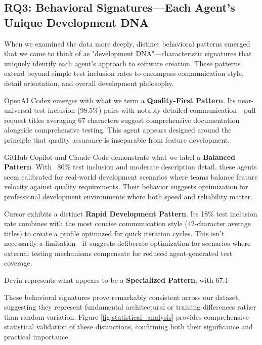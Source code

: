 \documentclass[conference]{IEEEtran}
\begin{document}
\subsection{RQ3: Behavioral Signatures—Each Agent's Unique Development DNA}

When we examined the data more deeply, distinct behavioral patterns emerged that we came to think of as "development DNA"—characteristic signatures that uniquely identify each agent's approach to software creation. These patterns extend beyond simple test inclusion rates to encompass communication style, detail orientation, and overall development philosophy.

OpenAI Codex emerges with what we term a \textbf{Quality-First Pattern}. Its near-universal test inclusion (98.5\%) pairs with notably detailed communication—pull request titles averaging 67 characters suggest comprehensive documentation alongside comprehensive testing. This agent appears designed around the principle that quality assurance is inseparable from feature development.

GitHub Copilot and Claude Code demonstrate what we label a \textbf{Balanced Pattern}. With ~80\% test inclusion and moderate description detail, these agents seem calibrated for real-world development scenarios where teams balance feature velocity against quality requirements. Their behavior suggests optimization for professional development environments where both speed and reliability matter.

Cursor exhibits a distinct \textbf{Rapid Development Pattern}. Its 18\% test inclusion rate combines with the most concise communication style (42-character average titles) to create a profile optimized for quick iteration cycles. This isn't necessarily a limitation—it suggests deliberate optimization for scenarios where external testing mechanisms compensate for reduced agent-generated test coverage.

Devin represents what appears to be a \textbf{Specialized Pattern}, with 67.1%

These behavioral signatures prove remarkably consistent across our dataset, suggesting they represent fundamental architectural or training differences rather than random variation. Figure \ref{fig:statistical_analysis} provides comprehensive statistical validation of these distinctions, confirming both their significance and practical importance.
\end{document}
